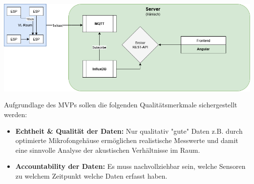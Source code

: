 \begin{center}
  \includegraphics[width=1\textwidth]{../images/MVP/MVPVisualisierung.png}
\end{center}

Aufgrundlage des MVPs sollen die folgenden Qualitätsmerkmale sichergestellt werden:
\begin{itemize}
    \item \textbf{Echtheit \& Qualität der Daten:}
    Nur qualitativ "gute" Daten z.B. durch optimierte Mikrofongehäuse ermöglichen realistische Messwerte und damit eine sinnvolle Analyse der akustischen Verhältnisse im Raum.
    \item \textbf{Accountability der Daten:}
    Es muss nachvollziehbar sein, welche Sensoren zu welchem Zeitpunkt welche Daten erfasst haben.
\end{itemize}
